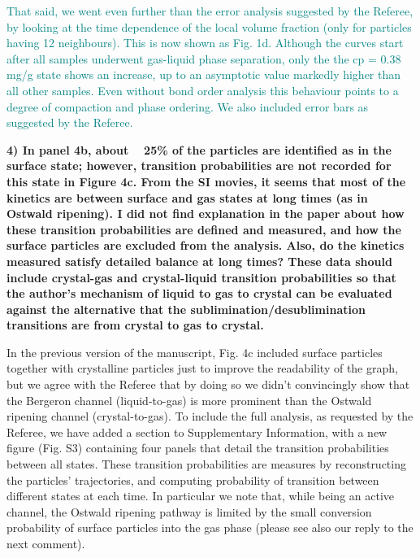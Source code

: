 \documentclass[11pt,a4paper]{article}
\newenvironment{referee}%
{\bigskip\singlespacing\bf}%
{\par\bigskip}
\begin{document}
\textcolor{teal}{That said, we went even further than the error analysis suggested by the Referee, by looking at the time dependence of the local volume fraction (only for particles having 12 neighbours). This is now shown as Fig. 1d. Although the curves start after all samples underwent gas-liquid phase separation, only the the cp = 0.38 mg/g state shows an increase, up to an asymptotic value markedly higher than all other samples. Even without bond order analysis this behaviour points to a degree of compaction and phase ordering. We also included error bars as suggested by the Referee.}


\begin{referee}
4) In panel 4b, about ~ 25\% of the particles are identified as in the surface state; however, transition probabilities are not recorded for this state in Figure 4c. From the SI movies, it seems that most of the kinetics are between surface and gas states at long times (as in Ostwald ripening). I did not find explanation in the paper about how these transition probabilities are defined and measured, and how the surface particles are excluded from the analysis. Also, do the kinetics measured satisfy detailed balance at long times? These data should include crystal-gas and crystal-liquid transition probabilities so that the author's mechanism of liquid to gas to crystal can be evaluated against the alternative that the sublimination/desublimination transitions are from crystal to gas to crystal.
\end{referee}

In the previous version of the manuscript, Fig. 4c included surface particles together with crystalline particles just to improve
the readability of the graph, but we agree with the Referee that by doing so we didn't convincingly show that the Bergeron channel (liquid-to-gas)
is more prominent than the Ostwald ripening channel (crystal-to-gas). 
To include the full analysis, as requested by the Referee,
we have added a section to Supplementary Information, with a new figure (Fig. S3) containing four panels that detail the transition
probabilities between all states. These transition probabilities are measures by reconstructing the particles' trajectories, and
computing probability of transition between different states at each time.
In particular we note that, while being an active channel, the Ostwald ripening pathway is limited by
the small conversion probability of surface particles into the gas phase (please see also our reply to the next comment).
\end{document}
